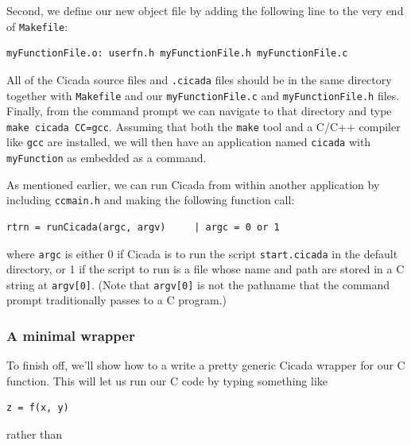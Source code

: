 \documentclass{article}
\newenvironment{code}{
       \begin{list}{}{
               \setlength{\leftmargin}{.4in}
               \setlength{\rightmargin}{0in}
               \setlength{\topsep}{.2in}
       }
       \small
       \item[] }
       { \end{list}   }
\begin{document}
\noindent Second, we define our new object file by adding the following line to the very end of \verb#Makefile#:

\begin{code} \begin{verbatim}
myFunctionFile.o: userfn.h myFunctionFile.h myFunctionFile.c
\end{verbatim} \end{code}

All of the Cicada source files and \verb#.cicada# files should be in the same directory together with \verb#Makefile# and our \verb#myFunctionFile.c# and \verb#myFunctionFile.h# files.  Finally, from the command prompt we can navigate to that directory and type \verb#make cicada CC=gcc#.  Assuming that both the \verb#make# tool and a C/C++ compiler like \verb#gcc# are installed, we will then have an application named \verb#cicada# with \verb#myFunction# as embedded as a command.  

As mentioned earlier, we can run Cicada from within another application by including \verb#ccmain.h# and making the following function call:

\begin{code} \begin{verbatim}
rtrn = runCicada(argc, argv)     | argc = 0 or 1
\end{verbatim} \end{code}

\noindent where \verb#argc# is either 0 if Cicada is to run the script \verb#start.cicada# in the default directory, or 1 if the script to run is a file whose name and path are stored in a C string at \verb#argv[0]#.  (Note that \verb#argv[0]# is not the pathname that the command prompt traditionally passes to a C program.)




\subsubsection{A minimal wrapper}

To finish off, we'll show how to a write a pretty generic Cicada wrapper for our C function.  This will let us run our C code by typing something like

\begin{code} \begin{verbatim}
z = f(x, y)
\end{verbatim} \end{code}

\noindent rather than
\end{document}
